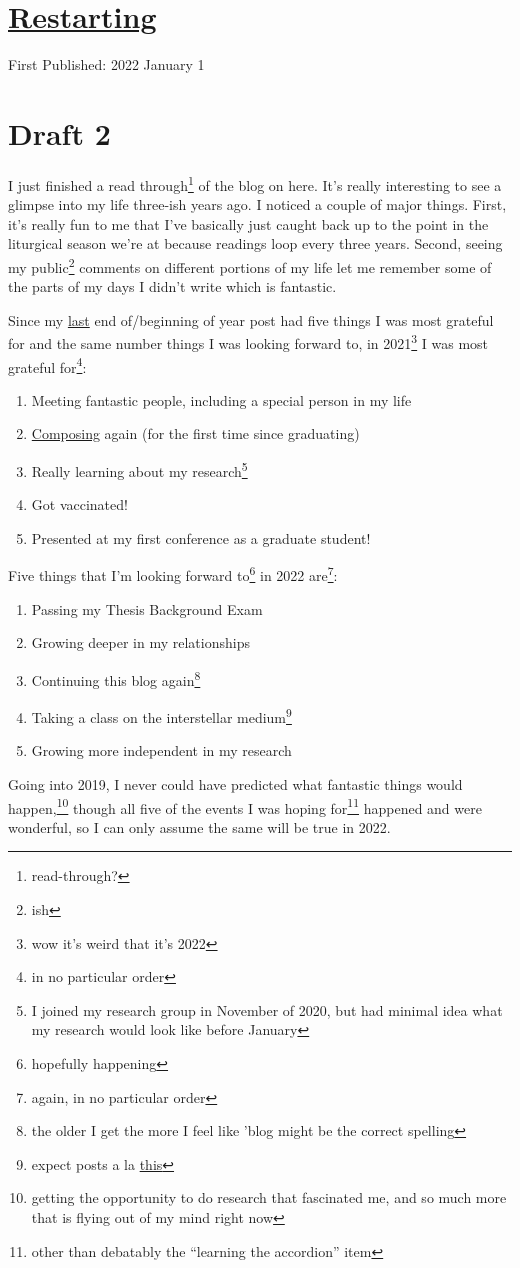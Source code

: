 \documentclass[12pt]{article}[titlepage]
\newcommand{\say}[1]{``#1''}
\newcommand{\1}{\={a}}
\newcommand{\2}{\={e}}
\newcommand{\3}{\={\i}}
\newcommand{\4}{\=o}
\newcommand{\5}{\=u}
\newcommand{\6}{\={A}}
\renewcommand{\,}{\textsuperscript{,}}
\begin{document}
\doublespacing
\section{\href{restarting.html}{Restarting}}
First Published: 2022 January 1
\section{Draft 2}
I just finished a read through\footnote{read-through?} of the blog on here.
It's really interesting to see a glimpse into my life three-ish years ago.
I noticed a couple of major things.
First, it's really fun to me that I've basically just caught back up to the point in the liturgical season we're at because readings loop every three years.
Second, seeing my public\footnote{ish} comments on different portions of my life let me remember some of the parts of my days I didn't write which is fantastic.

Since my \href{ending-18.html}{last} end of/beginning of year post had five things I was most grateful for and the same number things I was looking forward to, in 2021\footnote{wow it's weird that it's 2022} I was most grateful for\footnote{in no particular order}:
\begin{enumerate}
\item Meeting fantastic people, including a special person in my life
\item \href{/scores/Ave\%20Maris\%20Stella\%20Arti.pdf}{Composing} again (for the first time since graduating)
\item Really learning about my research\footnote{I joined my research group in November of 2020, but had minimal idea what my research would look like before January}
\item Got vaccinated!
\item Presented at my first conference as a graduate student!
\end{enumerate}
Five things that I'm looking forward to\footnote{hopefully happening} in 2022 are\footnote{again, in no particular order}:
\begin{enumerate}
\item Passing my Thesis Background Exam
\item Growing deeper in my relationships
\item Continuing this blog again\footnote{the older I get the more I feel like 'blog might be the correct spelling}
\item Taking a class on the interstellar medium\footnote{expect posts a la \href{polymer-1.html}{this}}
\item Growing more independent in my research
\end{enumerate}
Going into 2019, I never could have predicted what fantastic things would happen,\footnote{getting the opportunity to do research that fascinated me, and so much more that is flying out of my mind right now} though all five of the events I was hoping for\footnote{other than debatably the \say{learning the accordion} item} happened and were wonderful, so I can only assume the same will be true in 2022.
\end{document}
